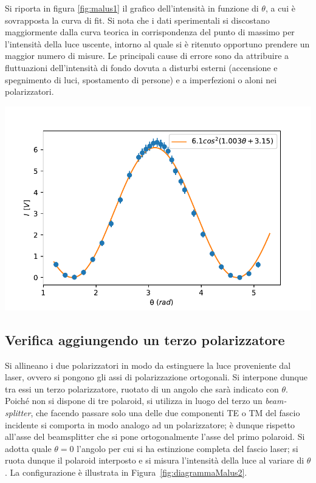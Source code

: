 \documentclass[10pt,oneside,a4paper]{article}
\newenvironment{Figure}
  {\par\medskip\noindent\minipage{\linewidth}}
  {\endminipage\par\medskip}
\begin{document}
\begin{multicols}{2}
Si riporta in figura \ref{fig:malus1} il grafico dell'intensità in funzione di $\theta$, a cui è sovrapposta la curva di fit. Si nota che i dati sperimentali si discostano maggiormente dalla curva teorica in corrispondenza del punto di massimo per l'intensità della luce uscente, intorno al quale si è ritenuto opportuno prendere un maggior numero di misure.
Le principali cause di errore sono da attribuire a fluttuazioni dell'intensità di fondo dovuta a disturbi esterni (accensione e spegnimento di luci, spostamento di persone) e a imperfezioni o aloni nei polarizzatori.


\begin{Figure}
	\begin{center}
	\includegraphics[width=\linewidth]{malus1.pdf}
	\label{fig:malus1}
	\end{center}
\end{Figure}

\subsection{Verifica aggiungendo un terzo polarizzatore}

Si allineano i due polarizzatori in modo da estinguere la luce proveniente dal laser, ovvero si pongono gli assi di polarizzazione ortogonali. Si interpone dunque tra essi un terzo polarizzatore, ruotato di un angolo che sarà indicato con $\theta$. Poiché non si dispone di tre polaroid, si utilizza in luogo del terzo un \emph{beam-splitter}, che facendo passare solo una delle due componenti TE o TM del fascio incidente si comporta in modo analogo ad un polarizzatore; è dunque rispetto all'asse del beamsplitter che si pone ortogonalmente l'asse del primo polaroid. Si adotta quale $\theta = 0$ l'angolo per cui si ha estinzione completa del fascio laser; si ruota dunque il polaroid interposto e si misura l'intensità della luce al variare di $\theta$. La configurazione è illustrata in Figura~\ref{fig:diagrammaMalus2}.


\end{multicols}
\end{document}
